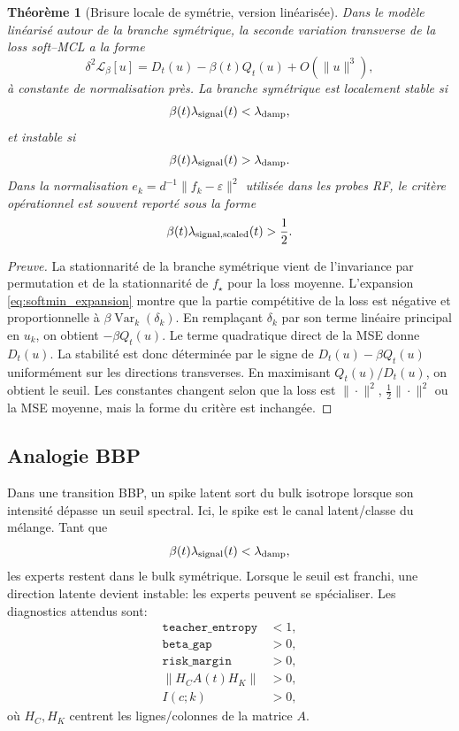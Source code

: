\documentclass[11pt,a4paper]{article}
\newtheorem{theorem}{Théorème}
\newcommand{\Var}{\operatorname{Var}}
\newcommand{\1}{\mathbf{1}}
\newcommand{\eps}{\varepsilon}
\begin{document}
\begin{theorem}[Brisure locale de symétrie, version linéarisée]
Dans le modèle linéarisé autour de la branche symétrique, la seconde variation transverse de la loss soft--MCL a la forme
\begin{equation}
\delta^2\mathcal L_\beta[u]
=D_t(u)-\beta(t)Q_t(u)+O(\|u\|^3),
\label{eq:second_var}
\end{equation}
à constante de normalisation près. La branche symétrique est localement stable si
\begin{equation}
\beta(t)\lambda_{\rm signal}(t)<\lambda_{\rm damp},
\end{equation}
et instable si
\begin{equation}
\beta(t)\lambda_{\rm signal}(t)>\lambda_{\rm damp}.
\end{equation}
Dans la normalisation $e_k=d^{-1}\|f_k-\eps\|^2$ utilisée dans les probes RF, le critère opérationnel est souvent reporté sous la forme
\begin{equation}
\beta(t)\lambda_{\rm signal,scaled}(t)>\frac12.
\end{equation}
\end{theorem}

\begin{proof}[Preuve]
La stationnarité de la branche symétrique vient de l'invariance par permutation et de la stationnarité de $f_\star$ pour la loss moyenne. L'expansion \eqref{eq:softmin_expansion} montre que la partie compétitive de la loss est négative et proportionnelle à $\beta\Var_k(\delta_k)$. En remplaçant $\delta_k$ par son terme linéaire principal en $u_k$, on obtient $-\beta Q_t(u)$. Le terme quadratique direct de la MSE donne $D_t(u)$. La stabilité est donc déterminée par le signe de $D_t(u)-\beta Q_t(u)$ uniformément sur les directions transverses. En maximisant $Q_t(u)/D_t(u)$, on obtient le seuil. Les constantes changent selon que la loss est $\|\cdot\|^2$, $\frac12\|\cdot\|^2$ ou la MSE moyenne, mais la forme du critère est inchangée.
\end{proof}

\subsection{Analogie BBP}

Dans une transition BBP, un spike latent sort du bulk isotrope lorsque son intensité dépasse un seuil spectral. Ici, le spike est le canal latent/classe du mélange. Tant que
\[
\beta(t)\lambda_{\rm signal}(t)<\lambda_{\rm damp},
\]
les experts restent dans le bulk symétrique. Lorsque le seuil est franchi, une direction latente devient instable: les experts peuvent se spécialiser. Les diagnostics attendus sont:
\begin{align}
\texttt{teacher\_entropy} &<1,\\
\texttt{beta\_gap} &>0,\\
\texttt{risk\_margin} &>0,\\
\|H_C A(t)H_K\| &>0,\\
I(c;k)&>0,
\end{align}
où $H_C,H_K$ centrent les lignes/colonnes de la matrice $A$.
\end{document}
